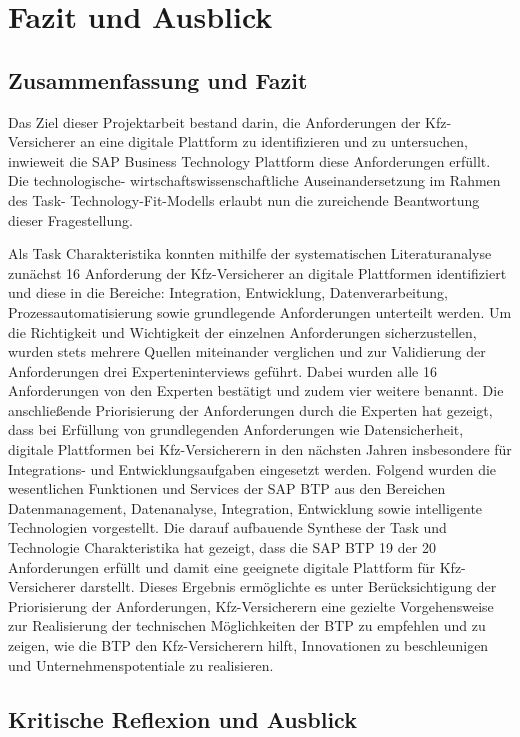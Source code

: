 \chapter{Fazit und Ausblick}

\section{Zusammenfassung und Fazit}

Das Ziel dieser Projektarbeit bestand darin, die Anforderungen der Kfz-Versicherer an eine digitale Plattform zu identifizieren und zu untersuchen, inwieweit die SAP Business Technology Plattform diese Anforderungen erfüllt. Die technologische- wirtschaftswissenschaftliche Auseinandersetzung im Rahmen des Task- Technology-Fit-Modells erlaubt nun die zureichende Beantwortung dieser Fragestellung.

Als Task Charakteristika konnten mithilfe der systematischen Literaturanalyse zunächst 16 Anforderung der Kfz-Versicherer an digitale Plattformen identifiziert und diese in die Bereiche: Integration, Entwicklung, Datenverarbeitung, Prozessautomatisierung sowie grundlegende Anforderungen unterteilt werden. Um die Richtigkeit und Wichtigkeit der einzelnen Anforderungen sicherzustellen, wurden stets mehrere Quellen miteinander verglichen und zur Validierung der Anforderungen drei Experteninterviews geführt. Dabei wurden alle 16 Anforderungen von den Experten bestätigt und zudem vier weitere benannt. Die anschließende Priorisierung der Anforderungen durch die Experten hat gezeigt, dass bei Erfüllung von grundlegenden Anforderungen wie Datensicherheit, digitale Plattformen bei Kfz-Versicherern in den nächsten Jahren insbesondere für Integrations- und Entwicklungsaufgaben eingesetzt werden. Folgend wurden die wesentlichen Funktionen und Services der SAP BTP aus den Bereichen Datenmanagement, Datenanalyse, Integration, Entwicklung sowie intelligente Technologien vorgestellt. Die darauf aufbauende Synthese der Task und Technologie Charakteristika hat gezeigt, dass die SAP BTP 19 der 20 Anforderungen erfüllt und damit eine geeignete digitale Plattform für Kfz-Versicherer darstellt. Dieses Ergebnis ermöglichte es unter Berücksichtigung der Priorisierung der Anforderungen, Kfz-Versicherern eine gezielte Vorgehensweise zur Realisierung der technischen Möglichkeiten der BTP zu empfehlen und zu zeigen, wie die BTP den Kfz-Versicherern hilft, Innovationen zu beschleunigen und Unternehmenspotentiale zu realisieren.

\newpage
\section{Kritische Reflexion und Ausblick}

